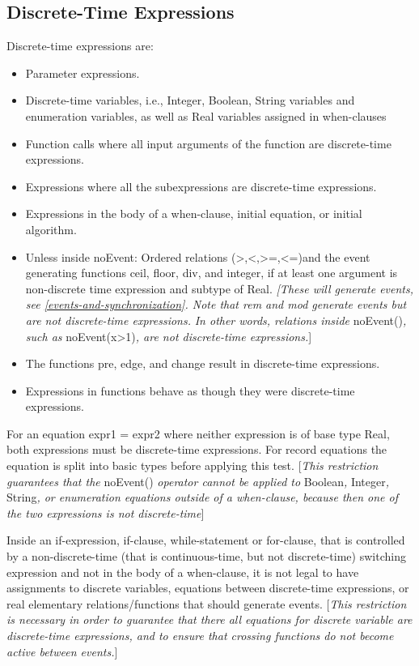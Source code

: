 \documentclass[10pt,a4paper]{report}
\def\doublelabel#1{\label{#1}\hypertarget{#1}{}}
\begin{document}
\subsection{Discrete-Time Expressions}\doublelabel{discrete-time-expressions}

Discrete-time expressions are:

\begin{itemize}
\item
  Parameter expressions.
\item
  Discrete-time variables, i.e., Integer, Boolean, String variables and
  enumeration variables, as well as Real variables assigned in
  when-clauses
\item
  Function calls where all input arguments of the function are
  discrete-time expressions.
\item
  Expressions where all the subexpressions are discrete-time
  expressions.
\item
  Expressions in the body of a when-clause, initial equation, or initial
  algorithm.
\item
  Unless inside noEvent: Ordered relations
  (\textgreater{},\textless{},\textgreater{}=,\textless{}=)and the event
  generating functions ceil, floor, div, and integer, if at least one
  argument is non-discrete time expression and subtype of Real.
  \emph{{[}These will generate events, see \ref{events-and-synchronization}. Note that
  rem and mod generate events but are not discrete-time expressions.}
  \emph{In other words, relations inside} noEvent()\emph{, such as}
  noEvent(x\textgreater{}1)\emph{, are not discrete-time
  expressions.}{]}
\item
  The functions pre, edge, and change result in discrete-time
  expressions.
\item
  Expressions in functions behave as though they were discrete-time
  expressions.
\end{itemize}

For an equation expr1 = expr2 where neither expression is of base type
Real, both expressions must be discrete-time expressions. For record
equations the equation is split into basic types before applying this
test. {[}\emph{This restriction guarantees that the} noEvent()
\emph{operator cannot be applied to} Boolean\emph{,} Integer\emph{,}
String\emph{, or enumeration equations outside of a when-clause, because
then one of the two expressions is not discrete-time}{]}

Inside an if-expression, if-clause, while-statement or for-clause, that
is controlled by a non-discrete-time (that is continuous-time, but not
discrete-time) switching expression and not in the body of a
when-clause, it is not legal to have assignments to discrete variables,
equations between discrete-time expressions, or real elementary
relations/functions that should generate events. {[}\emph{This
restriction is necessary in order to guarantee that there all equations
for discrete variable are discrete-time expressions, and to ensure that
crossing functions do not become active between events.}{]}
\end{document}
